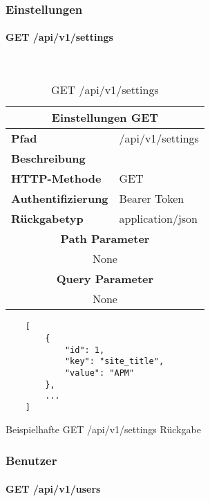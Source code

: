\subsubsection{Einstellungen}
\paragraph{GET /api/v1/settings}\mbox{}\\

\begin{table}[H]
  \centering
  \begin{tabular}{|l|l|}
  \hline
  \multicolumn{2}{|c|}{\textbf{Einstellungen GET}} \\ \hline
  \textbf{Pfad}                & /api/v1/settings  \\ \hline
  \textbf{Beschreibung}        &                     \\ \hline
  \textbf{HTTP-Methode}        & GET                 \\ \hline
  \textbf{Authentifizierung}   & Bearer Token        \\ \hline
  \textbf{Rückgabetyp}         & application/json    \\ \hline
  \multicolumn{2}{|c|}{\textbf{Path Parameter}}                      \\ \hline
  \multicolumn{2}{|c|}{None}          \\ \hline
  \multicolumn{2}{|c|}{\textbf{Query Parameter}}                      \\ \hline
  \multicolumn{2}{|c|}{None}          \\ \hline
  \end{tabular}
  \caption{GET /api/v1/settings}
\end{table}

\begin{listing}[H]
  \begin{verbatim}
    [
        {
            "id": 1,
            "key": "site_title",
            "value": "APM"
        },
        ...
    ]
  \end{verbatim}
  \caption{Beispielhafte GET /api/v1/settings Rückgabe}
\end{listing}

\subsubsection{Benutzer}
\paragraph{GET /api/v1/users}\mbox{}\\

